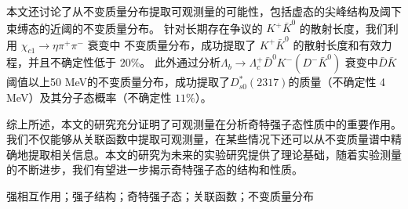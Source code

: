 本文还讨论了从不变质量分布提取可观测量的可能性，包括虚态的尖峰结构及阈下束缚态的近阈的不变质量分布。
针对长期存在争议的 \(K^{+}\bar{K}^{0}\) 的散射长度，我们利用 \(\chi_{c1} \to \eta\pi^+\pi^-\) 衰变中 不变质量分布，成功提取了 \(K^+\bar{K}^0\) 的散射长度和有效力程，并且不确定性低于 $20\%$。
此外通过分析$\Lambda_b \to \Lambda_c^+ \bar{D}^0 K^-(D^- \bar{K}^0)$ 衰变中$\bar{D}\bar{K}$阈值以上50 MeV的不变质量分布，成功提取了$D^{*}_{s0}(2317)$的质量（不确定性 4 MeV）及其分子态概率（不确定性 $11\%$）。

综上所述，本文的研究充分证明了可观测量在分析奇特强子态性质中的重要作用。我们不仅能够从关联函数中提取可观测量，在某些情况下还可以从不变质量谱中精确地提取相关信息。本文的研究为未来的实验研究提供了理论基础，随着实验测量的不断进步，我们有望进一步揭示奇特强子态的结构和性质。

\par
\vspace{0.5cm}
强相互作用；强子结构；奇特强子态；关联函数；不变质量分布
